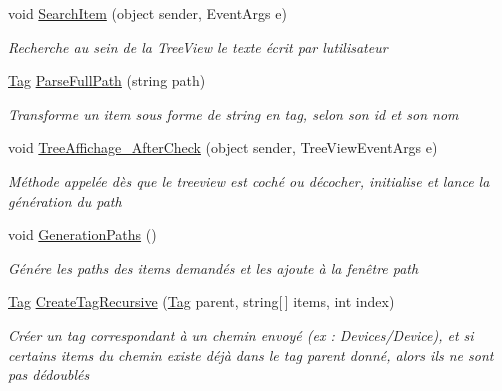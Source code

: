 \begin{DoxyCompactItemize}
void \mbox{\hyperlink{class_m_t_connect_agent_1_1_user_control_display_tab_a9645609103b3c419c143c6f0becad308}{Search\+Item}} (object sender, Event\+Args e)
\begin{DoxyCompactList}\small\item\em Recherche au sein de la Tree\+View le texte écrit par l\textquotesingle{}utilisateur \end{DoxyCompactList}\item 
\mbox{\hyperlink{class_m_t_connect_agent_1_1_model_1_1_tag}{Tag}} \mbox{\hyperlink{class_m_t_connect_agent_1_1_user_control_display_tab_adee83739d03527dcd7dd13c95d8ca3c9}{Parse\+Full\+Path}} (string path)
\begin{DoxyCompactList}\small\item\em Transforme un item sous forme de string en tag, selon son id et son nom \end{DoxyCompactList}\item 
void \mbox{\hyperlink{class_m_t_connect_agent_1_1_user_control_display_tab_a867300e7d41f63cf0e728ba0f137af94}{Tree\+Affichage\+\_\+\+After\+Check}} (object sender, Tree\+View\+Event\+Args e)
\begin{DoxyCompactList}\small\item\em Méthode appelée dès que le treeview est coché ou décocher, initialise et lance la génération du path \end{DoxyCompactList}\item 
void \mbox{\hyperlink{class_m_t_connect_agent_1_1_user_control_display_tab_ab942bfad7bf216e1b4915f0841d8c42f}{Generation\+Paths}} ()
\begin{DoxyCompactList}\small\item\em Génére les paths des items demandés et les ajoute à la fenêtre path \end{DoxyCompactList}\item 
\mbox{\hyperlink{class_m_t_connect_agent_1_1_model_1_1_tag}{Tag}} \mbox{\hyperlink{class_m_t_connect_agent_1_1_user_control_display_tab_a7fc3123014a0546fd4fb29d2ced80183}{Create\+Tag\+Recursive}} (\mbox{\hyperlink{class_m_t_connect_agent_1_1_model_1_1_tag}{Tag}} parent, string\mbox{[}$\,$\mbox{]} items, int index)
\begin{DoxyCompactList}\small\item\em Créer un tag correspondant à un chemin envoyé (ex \+: Devices/\+Device), et si certains items du chemin existe déjà dans le tag parent donné, alors ils ne sont pas dédoublés \end{DoxyCompactList}\item 

\end{DoxyCompactItemize}
